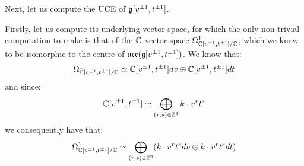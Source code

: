        \begin{example} \label{example: toroidal_lie_algebras_centres}
            Next, let us compute the UCE of $\mathfrak{g}[v^{\pm 1}, t^{\pm 1}]$. 
            
            Firstly, let us compute its underlying vector space, for which the only non-trivial computation to make is that of the $\mathbb{C}$-vector space $\bar{\Omega}^1_{\mathbb{C}[v^{\pm 1}, t^{\pm 1}]/\mathbb{C}}$, which we know to be isomorphic to the centre of $\mathfrak{uce}(\mathfrak{g}[v^{\pm 1}, t^{\pm 1}])$. We know that:
                $$\Omega^1_{\mathbb{C}[v^{\pm 1}, t^{\pm 1}]/\mathbb{C}} \simeq \mathbb{C}[v^{\pm 1}, t^{\pm 1}] dv \oplus \mathbb{C}[v^{\pm 1}, t^{\pm 1}] dt$$
            and since:
                $$\mathbb{C}[v^{\pm 1}, t^{\pm 1}] \simeq \bigoplus_{(r, s) \in \mathbb{Z}^2} k \cdot v^r t^s$$
            we consequently have that:
                $$\Omega^1_{\mathbb{C}[v^{\pm 1}, t^{\pm 1}]/\mathbb{C}} \simeq \bigoplus_{(r, s) \in \mathbb{Z}^2} (k \cdot v^r t^s dv \oplus k \cdot v^r t^s dt)$$
            

\end{example}
